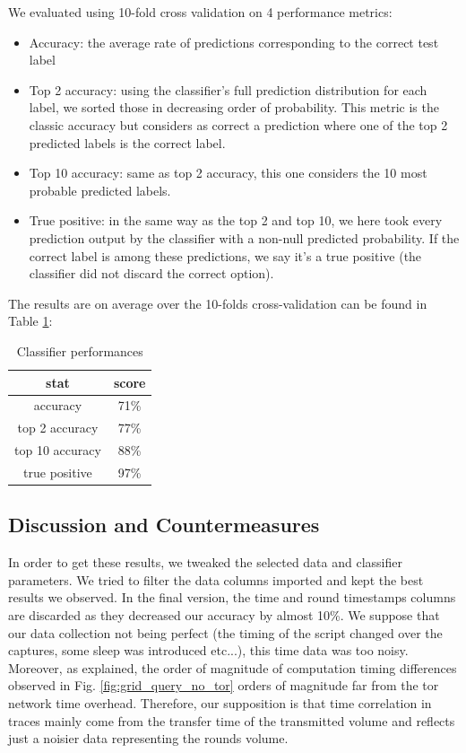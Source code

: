 \documentclass[10pt,conference,compsocconf]{IEEEtran}
\begin{document}
We evaluated using 10-fold cross validation on 4 performance metrics:
\begin{itemize}
    \item Accuracy: the average rate of predictions corresponding to the correct test label
    \item Top 2 accuracy: using the classifier's full prediction distribution for each label, we sorted those in decreasing order of probability. This metric is the classic accuracy but considers as correct a prediction where one of the top 2 predicted labels is the correct label.
    \item Top 10 accuracy: same as top 2 accuracy, this one considers the 10 most probable predicted labels.
    \item True positive: in the same way as the top 2 and top 10, we here took every prediction output by the classifier with a non-null predicted probability. If the correct label is among these predictions, we say it's a true positive (the classifier did not discard the correct option).
\end{itemize}
The results are on average over the 10-folds cross-validation can be found in Table \ref{tab:class_perf}:
\begin{table}[h!]
\centering
\begin{tabular}{ |c|c| } 
\hline
stat & score \\
\hline
\hline
accuracy & 71\% \\ 
top 2 accuracy & 77\% \\ 
top 10 accuracy & 88\% \\
true positive & 97\% \\ 
\hline
\end{tabular}
\caption{\label{tab:class_perf}Classifier performances}
\end{table}

\subsection{Discussion and Countermeasures}

In order to get these results, we tweaked the selected data and classifier parameters. We tried to filter the data columns imported and kept the best results we observed. In the final version, the time and round timestamps columns are discarded as they decreased our accuracy by almost 10\%. We suppose that our data collection not being perfect (the timing of the script changed over the captures, some sleep was introduced etc...), this time data was too noisy. Moreover, as explained, the order of magnitude of computation timing differences observed in Fig. \ref{fig:grid_query_no_tor} orders of magnitude far from the tor network time overhead. Therefore, our supposition is that time correlation in traces mainly come from the transfer time of the transmitted volume and reflects just a noisier data representing the rounds volume.
\end{document}
